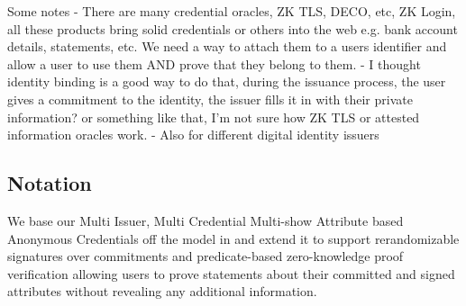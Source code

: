 Some notes
- There are many credential oracles, ZK TLS, DECO, etc, ZK Login, all these products bring solid credentials or others into the web e.g. bank account details, statements, etc. We need a way to attach them to a users identifier and allow a user to use them AND prove that they belong to them. 
- I thought identity binding is a good way to do that, during the issuance process, the user gives a commitment to the identity, the issuer fills it in with their private information? or something like that, I'm not sure how ZK TLS or attested information oracles work.
- Also for different digital identity issuers





















\subsection{Notation}
We base our Multi Issuer, Multi Credential Multi-show Attribute based Anonymous Credentials off the model in \cite{fuchsbauer_structure-preserving_2019} and extend it to support rerandomizable signatures over commitments and predicate-based zero-knowledge proof verification allowing users to prove statements about their committed and signed attributes without revealing any additional information.

